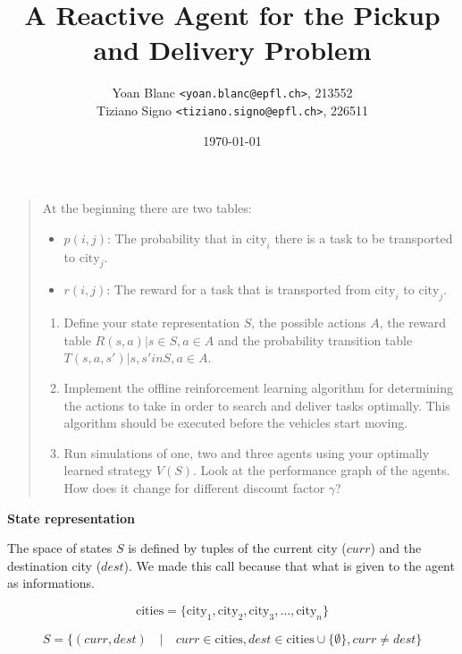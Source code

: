 \documentclass[11pt,a4paper]{article}
\title{\phantomsection%
    A Reactive Agent for the Pickup and Delivery Problem
}
\author{
    Yoan Blanc \texttt{<yoan.blanc@epfl.ch>}, 213552\\
    Tiziano Signo \texttt{<tiziano.signo@epfl.ch>}, 226511
}
\date{\today}
\begin{document}
\maketitle

\noindent
\begin{quote}{\it

    At the beginning there are two tables:

    \begin{itemize}
        \item $p(i,j)$: The probability that in $\text{city}_i$ there is a task to be transported to $\text{city}_j$.
        \item $r(i,j)$: The reward for a task that is transported from $\text{city}_i$ to $\text{city}_j$.
    \end{itemize}

    \begin{enumerate}
        \item Define your state representation $S$, the possible actions $A$, the
            reward table $R(s,a) | s \in S, a \in A$ and the probability transition
            table $T(s,a,s') | s, s' in S, a \in A$.

        \item Implement the offline reinforcement learning algorithm for
            determining the actions to take in order to search and deliver
            tasks optimally. This algorithm should be executed before the
            vehicles start moving.

        \item Run simulations of one, two and three agents using your optimally
            learned strategy $V(S)$. Look at the performance graph of the agents.
            How does it change for different discount factor $\gamma$?

    \end{enumerate}
}\end{quote}

\newpage
\medskip
\textbf{State representation}

The space of states $S$ is defined by tuples of the current city ($curr$)
and the destination city ($dest$). We made this call because that what
is given to the agent as informations.

$$ \text{cities} = \{ \text{city}_1, \text{city}_2, \text{city}_3, \ldots, \text{city}_n \}$$

$$ S = \{ (curr, dest) \quad | \quad curr \in \text{cities}, dest \in
\text{cities} \cup \{ \emptyset \}, curr \neq dest \} $$
\end{document}

